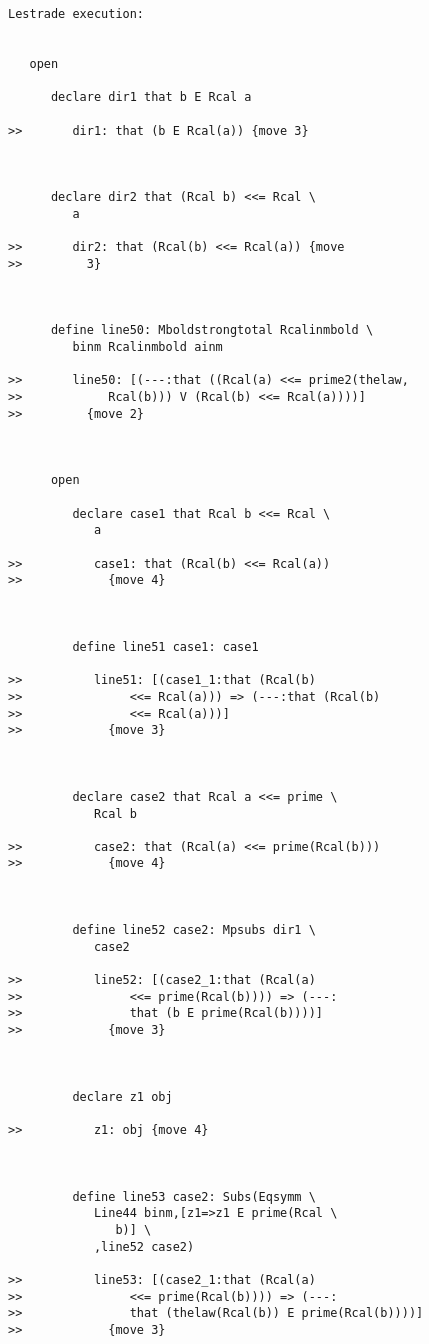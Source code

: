 \documentclass[12pt]{article}
\begin{document}
\begin{verbatim}Lestrade execution:


   open

      declare dir1 that b E Rcal a

>>       dir1: that (b E Rcal(a)) {move 3}



      declare dir2 that (Rcal b) <<= Rcal \
         a

>>       dir2: that (Rcal(b) <<= Rcal(a)) {move
>>         3}



      define line50: Mboldstrongtotal Rcalinmbold \
         binm Rcalinmbold ainm

>>       line50: [(---:that ((Rcal(a) <<= prime2(thelaw,
>>            Rcal(b))) V (Rcal(b) <<= Rcal(a))))]
>>         {move 2}



      open

         declare case1 that Rcal b <<= Rcal \
            a

>>          case1: that (Rcal(b) <<= Rcal(a))
>>            {move 4}



         define line51 case1: case1

>>          line51: [(case1_1:that (Rcal(b)
>>               <<= Rcal(a))) => (---:that (Rcal(b)
>>               <<= Rcal(a)))]
>>            {move 3}



         declare case2 that Rcal a <<= prime \
            Rcal b

>>          case2: that (Rcal(a) <<= prime(Rcal(b)))
>>            {move 4}



         define line52 case2: Mpsubs dir1 \
            case2

>>          line52: [(case2_1:that (Rcal(a)
>>               <<= prime(Rcal(b)))) => (---:
>>               that (b E prime(Rcal(b))))]
>>            {move 3}



         declare z1 obj

>>          z1: obj {move 4}



         define line53 case2: Subs(Eqsymm \
            Line44 binm,[z1=>z1 E prime(Rcal \
               b)] \
            ,line52 case2)

>>          line53: [(case2_1:that (Rcal(a)
>>               <<= prime(Rcal(b)))) => (---:
>>               that (thelaw(Rcal(b)) E prime(Rcal(b))))]
>>            {move 3}




\end{verbatim}
\end{document}

